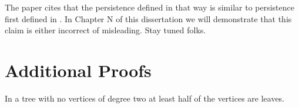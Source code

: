 The paper \cite{ct-branch-decomp} cites that the persistence defined in that way is similar to persistence first defined in \cite{persistence-original}. In Chapter N of this dissertation we will demonstrate that this claim is either incorrect of misleading. Stay tuned folks.












\section{Additional Proofs}

\begin{lem} In a tree with no vertices of degree two at least half of the vertices are leaves. \end{lem}

